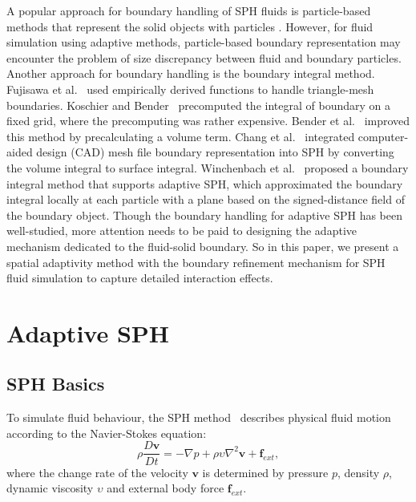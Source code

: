 \documentclass[VANCOUVER,STIX1COL]{WileyNJD-v2}
\begin{document}
A popular approach for boundary handling of SPH fluids is particle-based methods that represent the solid objects with particles \cite{Akinci12, Band18b}. However, for fluid simulation using adaptive methods, particle-based boundary representation may encounter the problem of size discrepancy between fluid and boundary particles. Another approach for boundary handling is the boundary integral method. Fujisawa et al.~\cite{Fujisawa15} used empirically derived functions to handle triangle-mesh boundaries. Koschier and Bender~\cite{Koschier17} precomputed the integral of boundary on a fixed grid, where the precomputing was rather expensive. Bender et al.~\cite{Bender19} improved this method by precalculating a volume term. Chang et al.~\cite{Chang20} integrated computer-aided design (CAD) mesh file boundary representation into SPH by converting the volume integral to surface integral. Winchenbach et al.~\cite{Winchenbach20} proposed a boundary integral method that supports adaptive SPH, which approximated the boundary integral locally at each particle with a plane based on the signed-distance field of the boundary object. Though the boundary handling for adaptive SPH has been well-studied, more attention needs to be paid to designing the adaptive mechanism dedicated to the fluid-solid boundary. So in this paper, we present a spatial adaptivity method with the boundary refinement mechanism for SPH fluid simulation to capture detailed interaction effects.

\section{Adaptive SPH}

\subsection{SPH Basics}

To simulate fluid behaviour, the SPH method~\cite{Koschier19} describes physical fluid motion according to the Navier-Stokes equation:
\begin{equation}
    \rho \frac{D\mathbf{v}}{Dt}=-\nabla p + \rho \upsilon \nabla^2 \mathbf{v} + \mathbf{f}_{ext},
\label{equ-2}
\end{equation}
where the change rate of the velocity $\mathbf{v}$ is determined by pressure $p$, density $\rho$, dynamic viscosity $\upsilon$ and external body force $\mathbf{f}_{ext}$.
\end{document}
